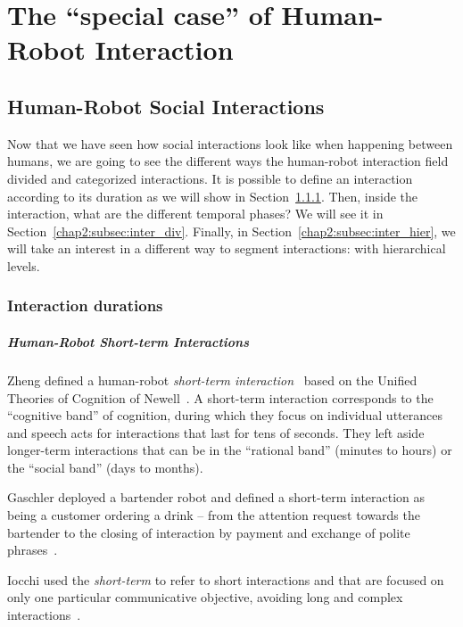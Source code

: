 \documentclass[a4paper,11pt,twoside]{StyleThese}
\begin{document}
	\setcounter{chapter}{1} %
	\dominitoc
	\faketableofcontents
	\fi


\chapter{The ``special case'' of Human-Robot Interaction}\label{chapter:chap2}
\minitoc
\section{Human-Robot Social Interactions}\label{chap2:sec:soc_inter}

Now that we have seen how social interactions look like when happening between humans, we are going to see the different ways the human-robot interaction field divided and categorized interactions. It is possible to define an interaction according to its duration as we will show in Section~\ref{chap2:subsec:inter_lengths}. Then, inside the interaction, what are the different temporal phases? We will see it in Section~\ref{chap2:subsec:inter_div}. Finally, in Section~\ref{chap2:subsec:inter_hier}, we will take an interest in a different way to segment interactions: with hierarchical levels.

\subsection{Interaction durations}\label{chap2:subsec:inter_lengths}
\paragraph{Human-Robot Short-term Interactions}
Zheng \etal{} defined a human-robot \emph{short-term interaction}~\cite{zheng_2013_designing} based on the Unified Theories of Cognition of Newell~\cite{newell_1994_unified}. A short-term interaction corresponds to the ``cognitive band'' of cognition, during which they focus on individual utterances and speech acts for interactions that last for tens of seconds. They left aside longer-term interactions that can be in the ``rational band'' (minutes to hours) or the ``social band'' (days to months).

Gaschler \etal{} deployed a bartender robot and defined a short-term interaction as being a customer ordering a drink – from the attention request towards the bartender to the closing of interaction by payment and exchange of polite phrases~\cite{gaschler_2012_modelling}.

Iocchi \etal{} used the \emph{short-term} to refer to short interactions and that are focused on only one particular communicative objective, avoiding long and complex interactions~\cite{iocchi_2015_personalized}.
\end{document}
